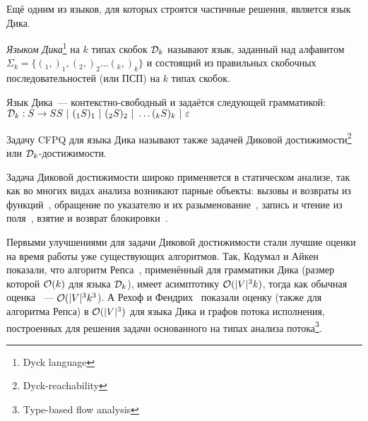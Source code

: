 Ещё одним из языков, для которых строятся частичные решения, является язык Дика.

\begin{definition}\label{def:dyck}
  \textit{Языком Дика}\footnote{Dyck language} на $k$ типах скобок $\mathcal{D}_k$ называют язык, заданный над алфавитом $\Sigma_k = \{ (_1, )_1, (_2, )_2 \dots (_k, )_k \}$ и состоящий из правильных скобочных последовательностей (или ПСП) на $k$ типах скобок.

  Язык Дика~--- контекстно-свободный и задаётся следующей грамматикой:\\ $\mathcal{D}_k : S \rightarrow S S~|~(_1 S )_1 ~|~ (_2 S )_2~|~ \dots (_k S )_k ~|~ \varepsilon$

\end{definition}

\begin{definition}\label{def:dyck_reach}
  Задачу CFPQ для языка Дика называют также задачей Диковой достижимости\footnote{Dyck-reachability}~\cite{Kodumal04} или $\mathcal{D}_k$-достижимости.
\end{definition}

Задача Диковой достижимости широко применяется в статическом анализе, так как во многих видах анализа возникают парные объекты: вызовы и возвраты из функций~\cite{Tang15}, обращение по указателю и их разыменование~\cite{Zheng08}, запись и чтение из поля~\cite{Yan11}, взятие и возврат блокировки~\cite{Kahlon09}.



Первыми улучшениями для задачи Диковой достижимости стали лучшие оценки на время работы уже существующих алгоритмов. Так, Кодумал и Айкен~\cite{Kodumal04} показали, что алгоритм Репса~\cite{Reps97}, применённый для грамматики Дика (размер которой $\mathcal{O}(k)$ для языка $\mathcal{D}_k$), имеет асимптотику $\mathcal{O}(|V|^3 k)$, тогда как обычная оценка ~--- $\mathcal{O}(|V|^3 k^3$). А Рехоф и Фендрих~\cite{Rehof01} показали оценку (также для алгоритма Репса) в $\mathcal{O}(|V|^3)$ для языка Дика и графов потока исполнения, построенных для решения задачи основанного на типах анализа потока\footnote{Type-based flow analysis}.

